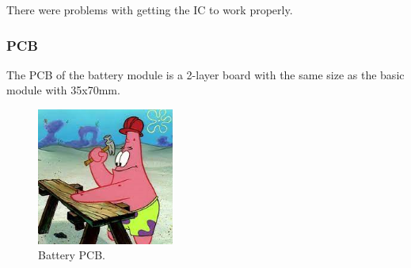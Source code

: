         There were problems with getting the IC to work properly. 
    
    \subsubsection{PCB}
        The PCB of the battery module is a 2-layer board with the same size as the basic module
        with 35x70mm.

        \begin{figure}[H]
            \centering
            \includegraphics[width=0.4\textwidth]{assets/HW/TBD2.png}
            \caption{Battery PCB.}
        \end{figure}